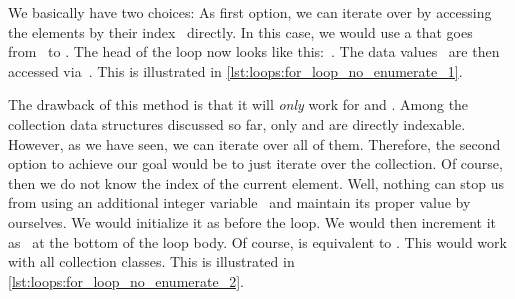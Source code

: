 We basically have two choices:
As first option, we can iterate over  by accessing the elements by their index~ directly.
In this case, we would use a  that goes from~ to .
The head of the loop now looks like this:~.
The data values~ are then accessed via~.
This is illustrated in \cref{lst:loops:for_loop_no_enumerate_1}.

The drawback of this method is that it will \emph{only} work for  and .
Among the collection data structures discussed so far, only  and  are directly indexable.
However, as we have seen, we can iterate over all of them.
Therefore, the second option to achieve our goal would be to just  iterate over the collection.
Of course, then we do not know the index of the current element.
Well, nothing can stop us from using an additional integer variable~ and maintain its proper value by ourselves.
We would initialize it as  before the loop.
We would then increment it as~ at the bottom of the loop body.
Of course,  is equivalent to \pythonIdx{+=}\pythonIdx{+}.
This would work with all collection classes.
This is illustrated in \cref{lst:loops:for_loop_no_enumerate_2}.

